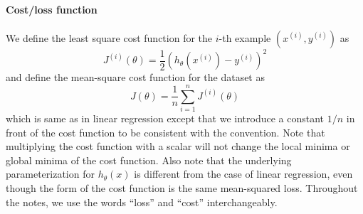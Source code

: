 \paragraph{Cost/loss function} We define the least square cost function for the $i$-th
example $(x^{(i)} ,y^{(i)} )$ as
\begin{equation}\label{eq:loss}
    J^{(i)} (\theta) = \frac{1}{2} \left(h_\theta (x^{(i)}) - y^{(i)}\right)^2
\end{equation}
and define the mean-square cost function for the dataset as
\begin{equation}\label{eq:mse_loss}
    J(\theta) = \frac 1 n \sum_{i=1}^n J^{(i)}(\theta)
\end{equation}
which is same as in linear regression except that we introduce a constant
$1/n$ in front of the cost function to be consistent with the convention. Note
that multiplying the cost function with a scalar will not change the local
minima or global minima of the cost function. Also note that the underlying
parameterization for $h_\theta(x)$ is different from the case of linear regression,
even though the form of the cost function is the same mean-squared loss.
Throughout the notes, we use the words ``loss'' and ``cost'' interchangeably.

